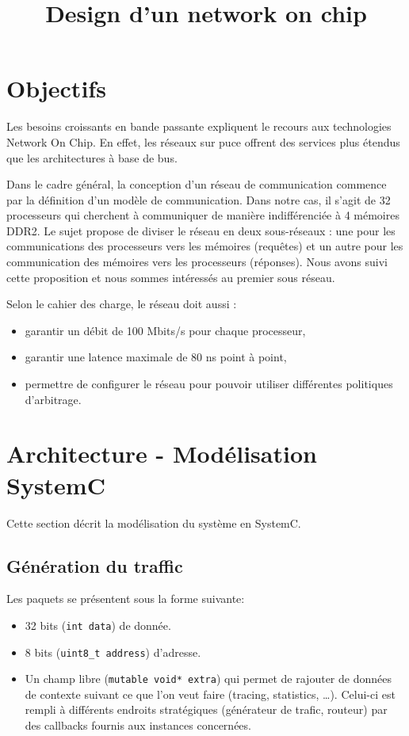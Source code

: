 \documentclass[11pt]{article}
\title{Design d'un network on chip}
\begin{document}
\maketitle

\section{Objectifs}

Les besoins croissants en bande passante expliquent le recours
aux technologies Network On Chip. En effet, les réseaux sur puce offrent des
services plus étendus que les architectures à base de bus.


Dans le cadre général, la conception d'un réseau de communication commence
par la définition d'un modèle de communication. Dans notre cas, il s'agit de 32
processeurs qui cherchent à communiquer de manière indifférenciée à 4 mémoires
DDR2. Le sujet propose de diviser le réseau en deux sous-réseaux : une pour les
communications des processeurs vers les mémoires (requêtes) et un autre pour les
communication des mémoires vers les processeurs (réponses). Nous avons suivi
cette proposition et nous sommes intéressés au premier sous réseau.

Selon le cahier des charge, le réseau doit aussi :
\begin{itemize}
  \item garantir un débit de 100 Mbits/s pour chaque processeur,
  \item garantir une latence maximale de 80 ns point à point,
  \item permettre de configurer le réseau pour pouvoir utiliser différentes
    politiques d'arbitrage.
\end{itemize}

\section{Architecture - Modélisation SystemC}

Cette section décrit la modélisation du système en SystemC.

\subsection{Génération du traffic}

Les paquets se présentent sous la forme suivante:
\begin{itemize}
  \item 32 bits (\texttt{int data}) de donnée.
  \item 8 bits (\texttt{uint8\_t address}) d'adresse.
  \item Un champ libre (\texttt{mutable void* extra}) qui permet de rajouter de
    données de contexte suivant ce que l'on veut faire (tracing, statistics,
    \ldots). Celui-ci est rempli à différents endroits stratégiques
    (générateur de trafic, routeur) par des callbacks fournis aux instances
    concernées.
\end{itemize}
\end{document}
